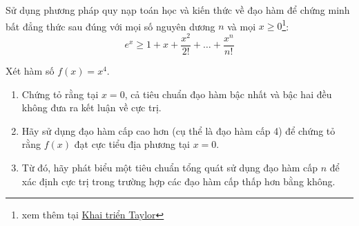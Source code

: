 \begin{exercise}
Sử dụng phương pháp quy nạp toán học và kiến thức về đạo hàm để chứng minh bất đẳng thức sau đúng với mọi số nguyên dương $n$ và mọi $x \ge 0$\footnote{xem thêm tại \href{https://en.wikipedia.org/wiki/Taylor_series}{Khai triển Taylor}}:
$$ e^x \ge 1 + x + \dfrac{x^2}{2!} + \dots + \dfrac{x^n}{n!} $$
\end{exercise}

\begin{exercise}
Xét hàm số $f(x) = x^4$.
\begin{enumerate}[label=(\alph*)]
    \item Chứng tỏ rằng tại $x=0$, cả tiêu chuẩn đạo hàm bậc nhất và bậc hai đều không đưa ra kết luận về cực trị.
    \item Hãy sử dụng đạo hàm cấp cao hơn (cụ thể là đạo hàm cấp 4) để chứng tỏ rằng $f(x)$ đạt cực tiểu địa phương tại $x=0$.
    \item Từ đó, hãy phát biểu một tiêu chuẩn tổng quát sử dụng đạo hàm cấp $n$ để xác định cực trị trong trường hợp các đạo hàm cấp thấp hơn bằng không.
\end{enumerate}
\end{exercise}
